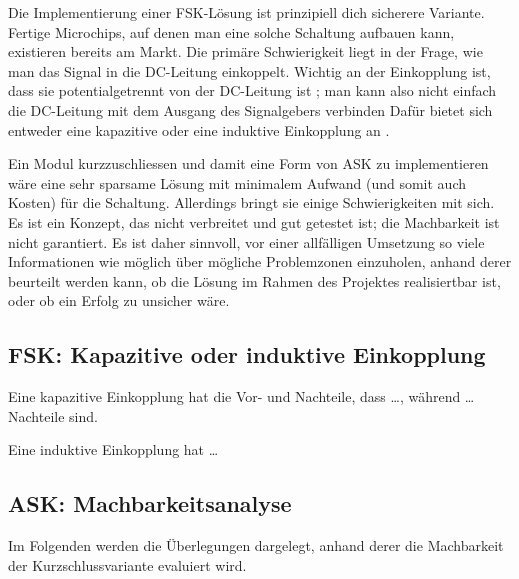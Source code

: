 Die  Implementierung   einer  FSK-L\"osung  ist  prinzipiell   dich  sicherere
Variante.  Fertige  Microchips, auf denen  man eine solche  Schaltung aufbauen
kann,  existieren  bereits  am  Markt. Die prim\"are  Schwierigkeit  liegt  in
der  Frage,  wie man  das  Signal  in  die DC-Leitung  einkoppelt. Wichtig  an
der  Einkopplung  ist,  dass  sie potentialgetrennt  von  der  DC-Leitung  ist
;  man kann  also  nicht  einfach die  DC-Leitung
mit   dem  Ausgang   des   Signalgebers  verbinden    Daf\"ur bietet sich entweder eine kapazitive oder eine
induktive Einkopplung an .

Ein  Modul kurzzuschliessen  und damit  eine  Form von  ASK zu  implementieren
w\"are  eine sehr  sparsame L\"osung  mit  minimalem Aufwand  (und somit  auch
Kosten) f\"ur die Schaltung. Allerdings  bringt sie einige Schwierigkeiten mit
sich. Es  ist  ein  Konzept,  das  nicht  verbreitet  und  gut  getestet  ist;
die  Machbarkeit  ist  nicht  garantiert. Es ist  daher  sinnvoll,  vor  einer
allf\"alligen Umsetzung so viele Informationen wie m\"oglich \"uber m\"ogliche
Problemzonen einzuholen, anhand  derer beurteilt werden kann,  ob die L\"osung
im Rahmen  des Projektes  realisiertbar ist,  oder ob  ein Erfolg  zu unsicher
w\"are.

\subsection{FSK: Kapazitive oder induktive Einkopplung}
\label{subsec:hw:fsk:kapaVsInduk}

Eine kapazitive Einkopplung hat die Vor- und Nachteile, dass \ldots, w\"ahrend
\ldots Nachteile sind.

Eine induktive Einkopplung hat \ldots {}


\subsection{ASK: Machbarkeitsanalyse}
\label{subsec:hw:ask:machbarkeit}

Im Folgenden werden die \"Uberlegungen dargelegt, anhand derer die Machbarkeit
der Kurzschlussvariante evaluiert wird.



